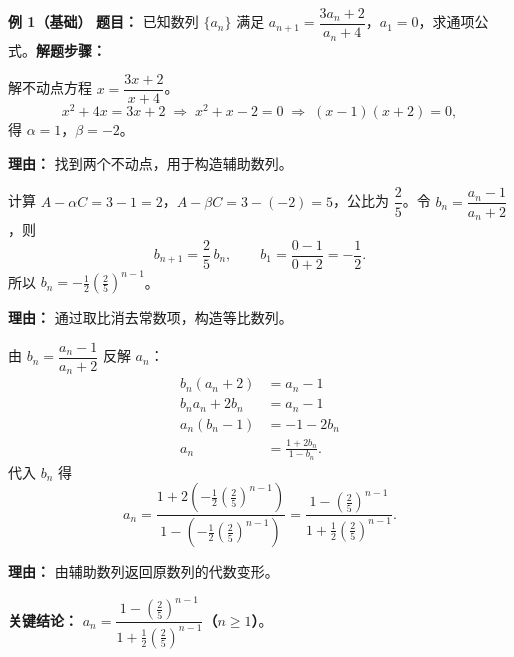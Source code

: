 \begin{examplebox}
	\textbf{\textcolor{CExample}{例 1（基础）}}
	\textbf{\textcolor{CExample}{题目：}} 已知数列 $\{a_n\}$ 满足 $a_{n+1}=\dfrac{3a_n+2}{a_n+4}$，$a_1=0$，求通项公式。\textbf{\textcolor{CExample}{解题步骤：}}
	\begin{description}[style=nextline, leftmargin=2.8em, labelsep=0.5em, itemsep=0.45em]
		\item[\textbf{第一步（不动点求解）：}]
			解不动点方程 $x=\dfrac{3x+2}{x+4}$。
			\[
				x^2+4x=3x+2\;\Longrightarrow\; x^2+x-2=0\;\Longrightarrow\; (x-1)(x+2)=0,
			\]
			得 $\alpha=1$，$\beta=-2$。
			\par\textbf{理由：} 找到两个不动点，用于构造辅助数列。
		\item[\textbf{第二步（构造等比）：}]
			计算 $A-\alpha C=3-1=2$，$A-\beta C=3-(-2)=5$，公比为 $\dfrac{2}{5}$。令 $b_n=\dfrac{a_n-1}{a_n+2}$，则
			\[
				b_{n+1}=\frac{2}{5}\,b_n,
				\qquad
				b_1=\frac{0-1}{0+2}=-\frac12.
			\]
			所以 $\displaystyle b_n = -\frac12\left(\frac{2}{5}\right)^{\!n-1}$。
			\par\textbf{理由：} 通过取比消去常数项，构造等比数列。
		\item[\textbf{第三步（反解通项）：}]
			由 $b_n=\dfrac{a_n-1}{a_n+2}$ 反解 $a_n$：
			\[
				\begin{aligned}
					b_n(a_n+2)&=a_n-1 \\ b_n a_n+2b_n &= a_n-1 \\ a_n(b_n-1) &= -1-2b_n \\ a_n &= \frac{1+2b_n}{1-b_n}.
			\end{aligned}
			\]
			代入 $b_n$ 得
			\[
				a_n = \frac{1+2\left(-\frac12\left(\frac{2}{5}\right)^{n-1}\right)}{1-\left(-\frac12\left(\frac{2}{5}\right)^{n-1}\right)} = \frac{1-\left(\frac{2}{5}\right)^{n-1}}{1+\frac12\left(\frac{2}{5}\right)^{n-1}}.
			\]
			\par\textbf{理由：} 由辅助数列返回原数列的代数变形。
	\end{description}
	\textbf{\textcolor{CExample}{关键结论：}}
	\textbf{$a_n = \dfrac{1-\left(\frac{2}{5}\right)^{n-1}}{1+\frac12\left(\frac{2}{5}\right)^{n-1}}$（$n\ge 1$）}。


\end{examplebox}
